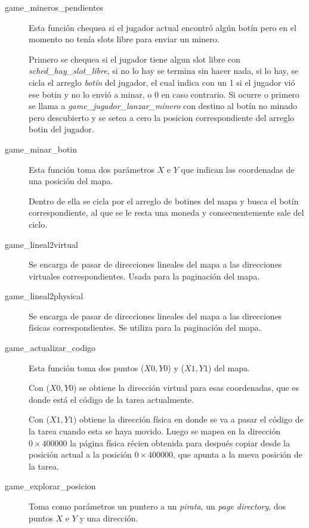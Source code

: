 \begin{description}
\item[game_mineros_pendientes]
  Esta función chequea si el jugador actual encontró algún botín pero en el
  momento no tenía slots libre para enviar un minero.

  Primero se chequea si el jugador tiene algun slot libre con
  {\it sched_hay_slot_libre\/}, si no lo hay se termina sin hacer nada, si lo
  hay, se cicla el arreglo {\it botín\/} del jugador, el cual indica con un 1 si el
  jugador vió ese botin y no lo envió a minar, o 0 en caso contrario. Si ocurre
   o primero se llama a {\it game_jugador_lanzar_minero\/} con destino al botín
   no minado pero descubierto y se setea a cero la posicion correspondiente del
   arreglo botin del jugador.

\item[game_minar_botin]
  Esta función toma dos parámetros $X$ e $Y$ que indican las coordenadas de una
  posición del mapa.

  Dentro de ella se cicla por el arreglo de botines del mapa y busca el botín
  correspondiente, al que se le resta una moneda y consecuentemente sale del
  ciclo.


\item[game_lineal2virtual] Se encarga de pasar de direcciones lineales del mapa
a las direcciones virtuales correspondientes. Usada para la paginación del mapa.

\item[game_lineal2physical] Se encarga de pasar de direcciones lineales del mapa
a las direcciones físicas correspondientes. Se utiliza para la paginación del
mapa.

\item[game_actualizar_codigo] Esta función toma dos puntos ($X0,Y0$) y ($X1,Y1$)
del mapa.

Con ($X0,Y0$) se obtiene la dirección virtual para esas coordenadas, que es
donde está el código de la tarea actualmente.

Con ($X1,Y1$) obtiene la dirección física en donde se va a pasar el código de
la tarea cuando esta se haya movido. Luego se mapea en la dirección
$0\times400000$ la página física récien obtenida para después copiar desde la
posición actual a la posición $0\times400000$, que apunta a la nueva posición de
la tarea.

\item[game_explorar_posicion]
  Toma como parámetros un puntero a un {\it pirata\/}, un
  {\it page directory\/}, dos puntos $X$ e $Y$ y una dirección.


\end{description}
